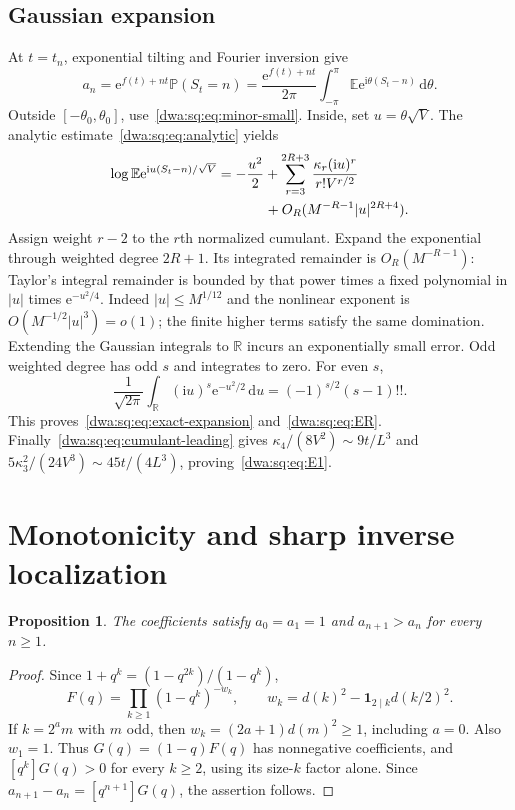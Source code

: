\documentclass[11pt,letterpaper]{article}
\numberwithin{equation}{section}
\newtheorem{proposition}[theorem]{Proposition}
\theoremstyle{remark}
\newcommand{\dd}{\mathrm d}
\newcommand{\e}{\mathrm e}
\newcommand{\ii}{\mathrm i}
\newcommand{\R}{\mathbb R}
\newcommand{\E}{\mathbb E}
\newcommand{\Prob}{\mathbb P}
\begin{document}
\subsection{Gaussian expansion}
At $t=t_n$, exponential tilting and Fourier inversion give
\begin{equation}\label{dwa:sq:eq:Fourier}
 a_n=\e^{f(t)+nt}\Prob(S_t=n)
 =\frac{\e^{f(t)+nt}}{2\pi}
 \int_{-\pi}^{\pi}\E\e^{\ii\theta(S_t-n)}\,\dd\theta.
\end{equation}
Outside $[-\theta_0,\theta_0]$, use~\eqref{dwa:sq:eq:minor-small}. Inside, set $u=\theta\sqrt V$. The analytic estimate~\eqref{dwa:sq:eq:analytic} yields
\begin{align}\label{dwa:sq:eq:local}
 \log\E\e^{\ii u(S_t-n)/\sqrt V}
 &=-\frac{u^2}{2}+\sum_{r=3}^{2R+3}
  \frac{\kappa_r(\ii u)^r}{r!V^{r/2}}\\
 &\hspace{12mm}+O_R(M^{-R-1}|u|^{2R+4}).\nonumber
\end{align}
Assign weight $r-2$ to the $r$th normalized cumulant. Expand the exponential through weighted degree $2R+1$. Its integrated remainder is $O_R(M^{-R-1})$: Taylor's integral remainder is bounded by that power times a fixed polynomial in $|u|$ times $\e^{-u^2/4}$. Indeed $|u|\le M^{1/12}$ and the nonlinear exponent is $O(M^{-1/2}|u|^3)=o(1)$; the finite higher terms satisfy the same domination. Extending the Gaussian integrals to $\R$ incurs an exponentially small error. Odd weighted degree has odd $s$ and integrates to zero. For even $s$,
\[
 \frac1{\sqrt{2\pi}}\int_{\R}(\ii u)^s\e^{-u^2/2}\,\dd u
 =(-1)^{s/2}(s-1)!!.
\]
This proves~\eqref{dwa:sq:eq:exact-expansion} and~\eqref{dwa:sq:eq:ER}. Finally~\eqref{dwa:sq:eq:cumulant-leading} gives $\kappa_4/(8V^2)\sim9t/L^3$ and $5\kappa_3^2/(24V^3)\sim45t/(4L^3)$, proving~\eqref{dwa:sq:eq:E1}.

\section{Monotonicity and sharp inverse localization}
\begin{proposition}\label{dwa:sq:prop:monotonicity}
The coefficients satisfy $a_0=a_1=1$ and $a_{n+1}>a_n$ for every $n\ge1$.
\end{proposition}
\begin{proof}
Since $1+q^k=(1-q^{2k})/(1-q^k)$,
\begin{equation}\label{dwa:sq:eq:Euler}
 F(q)=\prod_{k\ge1}(1-q^k)^{-w_k},\qquad
 w_k=d(k)^2-\mathbf1_{2\mid k}d(k/2)^2.
\end{equation}
If $k=2^am$ with $m$ odd, then $w_k=(2a+1)d(m)^2\ge1$, including $a=0$. Also $w_1=1$. Thus $G(q)=(1-q)F(q)$ has nonnegative coefficients, and $[q^k]G(q)>0$ for every $k\ge2$, using its size-$k$ factor alone. Since $a_{n+1}-a_n=[q^{n+1}]G(q)$, the assertion follows.
\end{proof}
\end{document}
